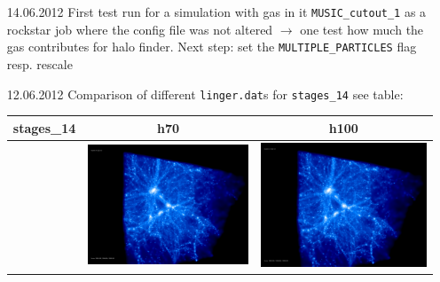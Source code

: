 \documentclass[a4paper,11pt,fleqn,oneside]{book}
\begin{document}
\begin{itemize}
\item[14.06.2012]
First test run for a simulation with gas in it \texttt{MUSIC\_cutout\_1} 
as a rockstar job where the config file was not altered $\rightarrow$ 
one test how much the gas contributes for halo finder. Next step: 
set the \texttt{MULTIPLE\_PARTICLES} flag resp. rescale \\

\item[12.06.2012]
Comparison of different \texttt{linger.dat}s for \texttt{stages\_14} see table: \\

\begin{table}[p]
\centering
\begin{tabular}{l|c|c}
stages\_14 & h70 & h100 \\
\hline 
 & \includegraphics[scale=0.075]{r256/h100/stages_14/197.jpg} & \includegraphics[scale=0.075]{r256/h100/stages_14/197.jpg} \\

\end{tabular}
\end{table}
\end{itemize}
\end{document}
